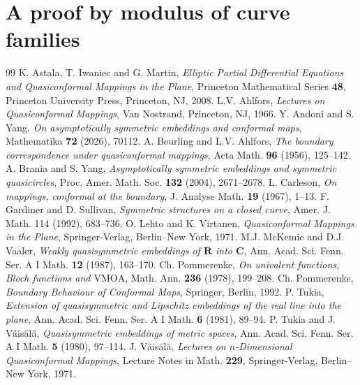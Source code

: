 \documentclass[10pt,a4paper]{amsart}
\numberwithin{equation}{section}
\begin{document}
\section{A proof by modulus of curve families}\label{sec:a_proof_by_modulus_of_curve_families}


\begin{thebibliography}{99}
 K. Astala, T. Iwaniec and G. Martin, {\it Elliptic Partial Differential Equations and Quasiconformal Mappings in the Plane}, Princeton Mathematical Series {\bf 48}, Princeton University Press, Princeton, NJ, 2008.
 L.V. Ahlfors, {\it Lectures on Quasiconformal Mappings}, Van Nostrand, Princeton, NJ, 1966.
 Y. Andoni and S. Yang, {\it On asymptotically symmetric embeddings and conformal maps}, Mathematika {\bf 72} (2026), 70112.
 A. Beurling and L.V. Ahlfors, {\it The boundary correspondence under quasiconformal mappings}, Acta Math. {\bf 96} (1956), 125--142.
 A. Brania and S. Yang, {\it Asymptotically symmetric embeddings and symmetric quasicircles}, Proc. Amer. Math. Soc. {\bf 132} (2004), 2671--2678.
 L. Carleson, {\it On mappings, conformal at the boundary}, J. Analyse Math. {\bf 19} (1967), 1--13.
 F. Gardiner and D. Sullivan, {\it Symmetric structures on a closed curve}, Amer. J. Math. 114 (1992), 683--736.
 O. Lehto and K. Virtanen, {\it Quasiconformal Mappings in the Plane}, Springer-Verlag, Berlin--New York, 1971.
 M.J. McKemie and D.J. Vaaler, {\it Weakly quasisymmetric embeddings of $\mathbf R$ into $\mathbf C$}, Ann. Acad. Sci. Fenn. Ser. A I Math. {\bf 12} (1987), 163--170.
 Ch. Pommerenke, {\it On univalent functions, Bloch functions and $\mathrm{VMOA}$}, Math. Ann. {\bf 236} (1978), 199--208.
 Ch. Pommerenke, {\it Boundary Behaviour of Conformal Maps}, Springer, Berlin, 1992.
 P. Tukia, {\it Extension of quasisymmetric and Lipschitz embeddings of the real line into the plane}, Ann. Acad. Sci. Fenn. Ser. A I Math. {\bf 6} (1981), 89--94.
 P. Tukia and J. V\"ais\"al\"a, {\it Quasisymmetric embeddings of metric spaces}, Ann. Acad. Sci. Fenn. Ser. A I Math. {\bf 5} (1980), 97--114.
 J. V\"ais\"al\"a, {\it Lectures on $n$-Dimensional Quasiconformal Mappings}, Lecture Notes in Math. {\bf 229}, Springer-Verlag, Berlin--New York, 1971.
\end{thebibliography}
\end{document}
